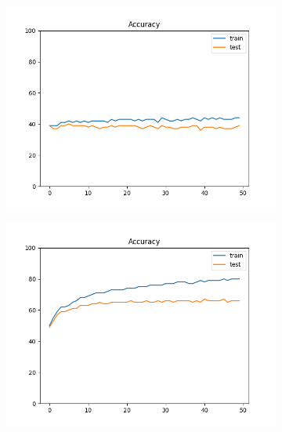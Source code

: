 \documentclass[12pt]{article}
\begin{document}
\begin{figure}
\begin{subfigure}{0.16\textwidth}
  \end{subfigure}
  \begin{subfigure}{0.16\textwidth}
    \centering
    \includegraphics[width=\linewidth]{accuracies_2_2_1.png}
  \end{subfigure}
  \begin{subfigure}{0.16\textwidth}
    \centering
    \includegraphics[width=\linewidth]{accuracies_2_3_bs4.png}
  \end{subfigure}
  \begin{subfigure}{0.16\textwidth}
    \centering

\end{subfigure}
\end{figure}
\end{document}
